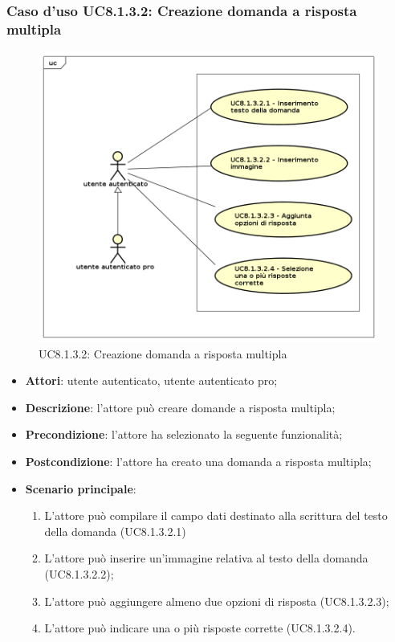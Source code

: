 \subsubsection{Caso d'uso UC8.1.3.2: Creazione domanda a risposta multipla}
	\label{UC8.1.3.2}
	\begin{figure}[h]
		\centering
			\includegraphics[scale=0.45,keepaspectratio]{UML/UC8_1_3_2.png}
		\caption{UC8.1.3.2: Creazione domanda a risposta multipla}
	\end{figure}
	\FloatBarrier
	\begin{itemize}
		\item
			\textbf{Attori}: utente autenticato, utente autenticato pro;
		\item		
			\textbf{Descrizione}: l'attore può creare domande a risposta multipla;
		\item
			\textbf{Precondizione}: l'attore ha selezionato la seguente funzionalità; 
		\item
			\textbf{Postcondizione}: l'attore ha creato una domanda a risposta multipla;
		\item
			\textbf{Scenario principale}:
	       		\begin{enumerate}
	       			\item
	       			L'attore può compilare il campo dati destinato alla scrittura del testo della domanda (UC8.1.3.2.1)
	       			\item
	       			L'attore può inserire un'immagine relativa al testo della domanda (UC8.1.3.2.2);
	       			\item
	       			L'attore può aggiungere almeno due opzioni di risposta (UC8.1.3.2.3);
					\item
					L'attore può indicare una o più risposte corrette (UC8.1.3.2.4).
	 			\end{enumerate}
	\end{itemize}

